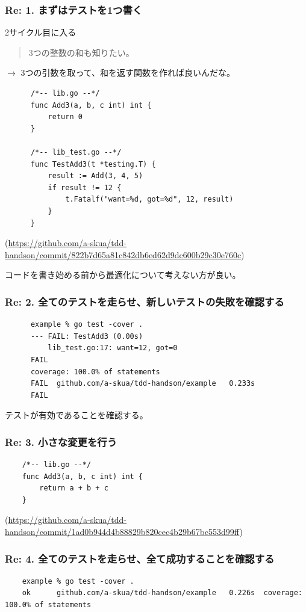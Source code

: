 \documentclass[aspectratio=169]{beamer}
\begin{document}
\begin{frame}[fragile]\frametitle{Re: 1. まずはテストを1つ書く}
  2サイクル目に入る

  \begin{quote}
    \color{blue}
    3つの整数の和も知りたい。
  \end{quote}
  $\rightarrow$ 3つの引数を取って、和を返す関数を作れば良いんだな。

  {
    \scriptsize
    \begin{verbatim}
      /*-- lib.go --*/
      func Add3(a, b, c int) int {
          return 0
      }

      /*-- lib_test.go --*/
      func TestAdd3(t *testing.T) {
          result := Add(3, 4, 5)
          if result != 12 {
              t.Fatalf("want=%d, got=%d", 12, result)
          }
      }
    \end{verbatim}

    {\color{gray} (\url{https://github.com/a-skua/tdd-handson/commit/822b7d65a81c842db6ed62d9dc600b29c30e760c})}
  }

  コードを書き始める前から最適化について考えない方が良い。
\end{frame}

\begin{frame}[fragile]\frametitle{Re: 2. 全てのテストを走らせ、新しいテストの失敗を確認する}
  {
    \scriptsize
    \color{gray}
    \begin{verbatim}
      example % go test -cover .
      --- FAIL: TestAdd3 (0.00s)
          lib_test.go:17: want=12, got=0
      FAIL
      coverage: 100.0% of statements
      FAIL	github.com/a-skua/tdd-handson/example	0.233s
      FAIL
    \end{verbatim}
  }

  テストが有効であることを確認する。
\end{frame}

\begin{frame}[fragile]\frametitle{Re: 3. 小さな変更を行う}
  \scriptsize
  \begin{verbatim}
    /*-- lib.go --*/
    func Add3(a, b, c int) int {
        return a + b + c
    }
  \end{verbatim}

  {\color{gray} (\url{https://github.com/a-skua/tdd-handson/commit/1ad0b944d4b88829b820cec4b29b67bc553d99ff})}
\end{frame}

\begin{frame}[fragile]\frametitle{Re: 4. 全てのテストを走らせ、全て成功することを確認する}
  \scriptsize
  \color{gray}
  \begin{verbatim}
    example % go test -cover .
    ok  	github.com/a-skua/tdd-handson/example	0.226s	coverage: 100.0% of statements
  \end{verbatim}
\end{frame}
\end{document}
